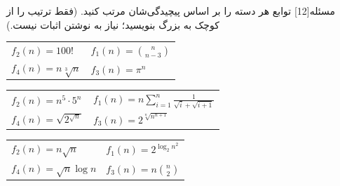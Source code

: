 ‌مسئله[12]  
توابع هر دسته را بر اساس پیچیدگی‌شان مرتب کنید. (فقط ترتیب را از کوچک به بزرگ بنویسید؛ نیاز به نوشتن اثبات نیست.)
\begin{large}
		\begin{center}
			\begin{tabular}{l l}
				$f_2(n) = 100! $&
				$f_1(n) = \binom{n}{n-3} $\\
				$f_4(n) = n\sqrt[3]{n}$&
				$f_3(n) = \pi^n $
			\end{tabular}
		\end{center}
\end{large}

\begin{large}
		\begin{center}
			\begin{tabular}{l l}
				$f_2(n) = n^5\cdot5^n $&
				$f_1(n) = n\sum\limits_{i=1}^n \frac{1}{\sqrt{i} + \sqrt{i+1}} $\\
				$f_4(n) = \sqrt{2^{\sqrt{n}}}$&
				$f_3(n) = 2^{\sqrt[n]{n^{n+1}}} $
			\end{tabular}
		\end{center}
\end{large}


\begin{large}
		\begin{center}
			\begin{tabular}{l l}
				$f_2(n) = n\sqrt{n} $&
				$f_1(n) = 2^{\log_2 n^2} $\\
				$f_4(n) = \sqrt{n}\log n$&
				$f_3(n) = n\binom{n}{2} $
			\end{tabular}
		\end{center}
\end{large}










